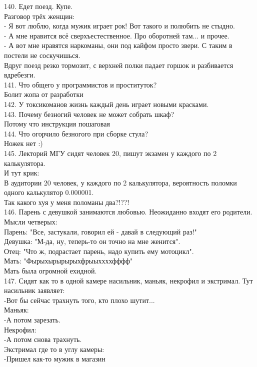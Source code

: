 \documentclass[a4paper,20pt,notitlepage]{extbook}
\begin{document}
	140. Едет поезд. Купе.\\
	Разговор трёх женщин:\\
	- Я вот люблю, когда мужик играет рок! Вот такого и полюбить не стыдно.\\
	- А мне нравится всё сверхъестественное. Про оборотней там... и прочее.\\
	- А вот мне нравятся наркоманы, они под кайфом просто звери. С таким в постели не соскучишься.\\
	Вдруг поезд резко тормозит, с верхней полки падает горшок и разбивается вдребезги.\\
	
	141. Что общего у программистов и проституток?\\
	Болит жопа от разработки\\
	
	142. У токсикоманов жизнь каждый день играет новыми красками.\\
	
	143. Почему безногий человек не может собрать шкаф?\\
	\quad Потому что инструкция пошаговая\\
	
	144. Что огорчило безногого при сборке стула?\\
	Ножек нет :)\\
	
	145. Лекторий МГУ сидят человек 20, пишут экзамен у каждого по 2 калькулятора. \\
	И тут крик:\\
	 В аудитории 20 человек, у каждого по 2 калькулятора, вероятность поломки одного калькулятор 0.000001.\\
	  Так какого хуя у меня поломаны два?!??!\\
	
	146. Парень с девушкой занимаются любовью. Неожиданно входят его родители. Мысли четверых:\\
	Парень: "Все, застукали, говорил ей - давай в следующий раз!"\\
	Девушка: "М-да, ну, теперь-то он точно на мне женится".\\
	Отец: "Что ж, подрастает парень, надо купить ему мотоцикл".\\
	Мать: "Фырыхырырырыхфрыыххххфффф"\\
	Мать была огромной ехидной.\\
	
	147. Сидят как то в одной камере насильник, маньяк, некрофил и экстримал. Тут насильник заявляет:\\
	-Вот бы сейчас трахнуть того, кто плохо шутит...\\
	Маньяк:\\
	-А потом зарезать.\\
	Некрофил:\\
	-А потом снова трахнуть.\\
	Экстримал где то в углу камеры:\\
	-Пришел как-то мужик в магазин\\
	
\end{document}

